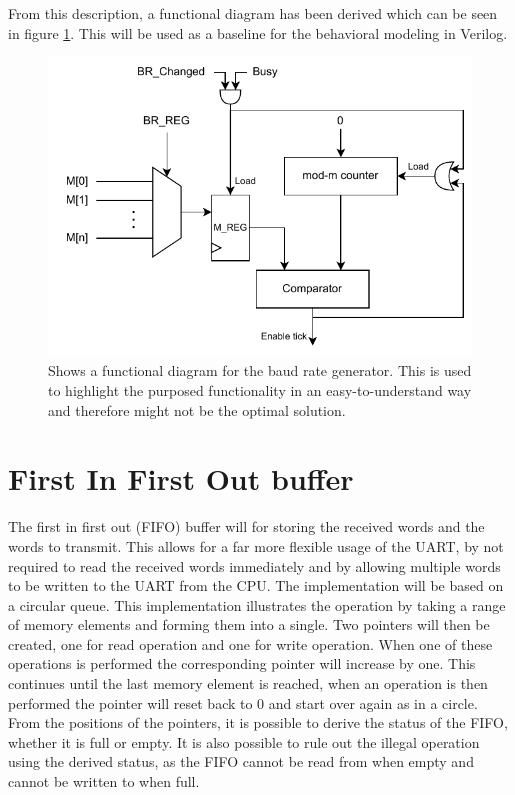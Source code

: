 \documentclass[./dissertation.tex]{subfiles}
\begin{document}
From this description, a functional diagram has been derived which can be seen in figure \ref{fig:uart_func_dia}. This will be used as a baseline for the behavioral modeling in Verilog.

\begin{figure}[H]
    \centering
    \includegraphics[width=0.9\linewidth]{subfiles/imgs/IP_Blocks_Pics/uart_func_dia.drawio.pdf}
    \caption{Shows a functional diagram for the baud rate generator. This is used to highlight the purposed functionality in an easy-to-understand way and therefore might not be the optimal solution.}
    \label{fig:uart_func_dia}
\end{figure}

\section{First In First Out buffer}
The first in first out (FIFO) buffer will for storing the received words and the words to transmit. This allows for a far more flexible usage of the UART, by not required to read the received words immediately and by allowing multiple words to be written to the UART from the CPU. The implementation will be based on a circular queue. This implementation illustrates the operation by taking a range of memory elements and forming them into a single. Two pointers will then be created, one for read operation and one for write operation. When one of these operations is performed the corresponding pointer will increase by one. This continues until the last memory element is reached, when an operation is then performed the pointer will reset back to 0 and start over again as in a circle. From the positions of the pointers, it is possible to derive the status of the FIFO, whether it is full or empty. It is also possible to rule out the illegal operation using the derived status, as the FIFO cannot be read from when empty and cannot be written to when full. 
\end{document}
